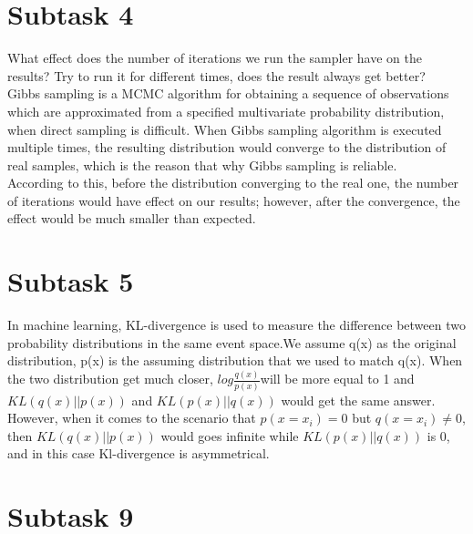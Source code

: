 \documentclass[12pt]{article}
\begin{document}
\section{Subtask 4}
What effect does the number of iterations we run the sampler have on the results? Try to run it for different times, does the result always get better?\\

Gibbs sampling is a MCMC algorithm for obtaining a sequence of observations which are approximated from a specified multivariate probability distribution, when direct sampling is difficult. When Gibbs sampling algorithm is executed multiple times, the resulting distribution would converge to the distribution of real samples, which is the reason that why Gibbs sampling is reliable.\\
According to this, before the distribution converging to the real one, the number of iterations would have effect on our results; however, after the convergence, the effect would be much smaller than expected.

\section{Subtask 5}
In machine learning, KL-divergence is used to measure the difference between two probability distributions in the same event space.We assume q(x) as the original distribution, p(x) is the assuming distribution that we used to match q(x).  When the two distribution get much closer, $log{\frac{q(x)}{p(x)}}$will be more equal to 1 and $KL(q(x)||p(x))$
and $KL(p(x)||q(x))$ would get the same answer. However, when it comes to the scenario that $p(x=x_i)=0$ but $q(x=x_i)\neq0$, then $KL(q(x)||p(x))$ would goes infinite while $KL(p(x)||q(x))$ is 0, and in this case Kl-divergence is asymmetrical.

\section{Subtask 9}
\end{document}
